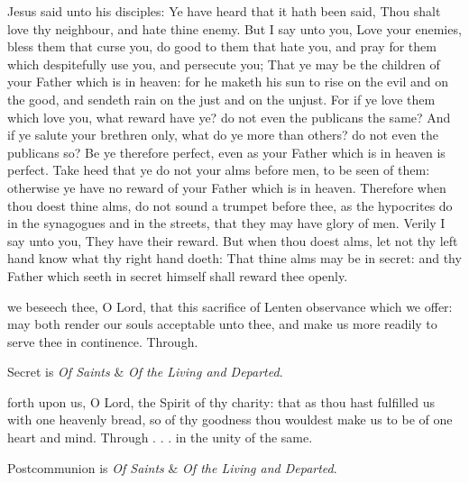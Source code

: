  Jesus said unto his disciples: Ye have heard that it hath been said, Thou shalt love thy neighbour, and hate thine enemy. But I say unto you, Love your enemies, bless them that curse you, do good to them that hate you, and pray for them which despitefully use you, and persecute you; That ye may be the children of your Father which is in heaven: for he maketh his sun to rise on the evil and on the good, and sendeth rain on the just and on the unjust. For if ye love them which love you, what reward have ye? do not even the publicans the same? And if ye salute your brethren only, what do ye more than others? do not even the publicans so? Be ye therefore perfect, even as your Father which is in heaven is perfect. Take heed that ye do not your alms before men, to be seen of them: otherwise ye have no reward of your Father which is in heaven. Therefore when thou doest thine alms, do not sound a trumpet before thee, as the hypocrites do in the synagogues and in the streets, that they may have glory of men. Verily I say unto you, They have their reward. But when thou doest alms, let not thy left hand know what thy right hand doeth: That thine alms may be in secret: and thy Father which seeth in secret himself shall reward thee openly.


\secret
{} we beseech thee, O Lord, that this sacrifice of Lenten observance which we offer: may both render our souls acceptable unto thee, and make us more readily to serve thee in continence. Through.

\begin{rubric}
     Secret is \emph{Of Saints} \&  \emph{Of the Living and Departed}.
\end{rubric}


\postcommunion
{} forth upon us, O Lord, the Spirit of thy charity: that as thou hast fulfilled us with one heavenly bread, so of thy goodness thou wouldest make us to be of one heart and mind. Through . . . in the unity of the same.

\begin{rubric}
     Postcommunion is \emph{Of Saints} \&  \emph{Of the Living and Departed}.
\end{rubric}

